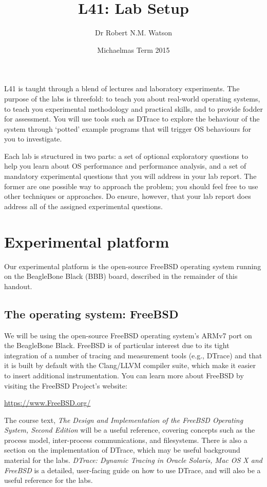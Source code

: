 \documentclass[a4paper,10pt]{article}
\begin{document}
\newcommand{\code}[1]{\texttt{\small #1}}

\title{L41: Lab Setup}
\author{Dr Robert N.M. Watson}
\date{Michaelmas Term 2015}
\maketitle

L41 is taught through a blend of lectures and laboratory experiments.
The purpose of the labs is threefold: to teach you about real-world operating
systems, to teach you experimental methodology and practical skills, and to
provide fodder for assessment.
You will use tools such as DTrace to explore the behaviour of the system
through `potted' example programs that will trigger OS behaviours for you to
investigate.

Each lab is structured in two parts: a set of optional exploratory questions
to help you learn about OS performance and performance analysis, and a set of
mandatory experimental questions that you will address in your lab report.
The former are one possible way to approach the problem; you should feel free
to use other techniques or approaches.
Do ensure, however, that your lab report does address all of the assigned
experimental questions.

\section*{Experimental platform}

Our experimental platform is the open-source FreeBSD operating system running
on the BeagleBone Black (BBB) board, described in the remainder of this
handout.

\subsection*{The operating system: FreeBSD}

We will be using the open-source FreeBSD operating system's ARMv7 port on the
BeagleBone Black.
FreeBSD is of particular interest due to its tight integration of a number of
tracing and measurement tools (e.g., DTrace) and that it is built by default
with the Clang/LLVM compiler suite, which make it easier to insert additional
instrumentation.
You can learn more about FreeBSD by visiting the FreeBSD Project's website:

\smallskip
\url{https://www.FreeBSD.org/}
\smallskip

The course text, \textit{The Design and Implementation of the FreeBSD
Operating System, Second Edition} will be a useful reference, covering
concepts such as the process model, inter-process communications, and
filesystems.
There is also a section on the implementation of DTrace, which may be useful
background material for the labs.
\textit{DTrace: Dynamic Tracing in Oracle Solaris, Mac OS X and FreeBSD} is a
detailed, user-facing guide on how to use DTrace, and will also be a useful
reference for the labs.
\end{document}
